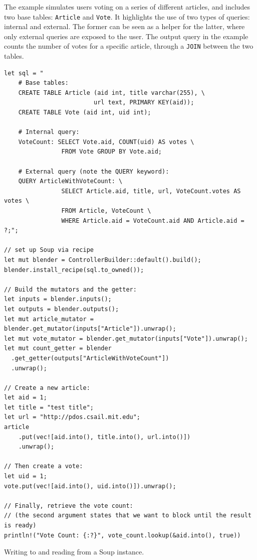 \documentclass[b5paper]{report}
\begin{document}
The example simulates users voting on a series of different articles, and
includes two base tables: \texttt{Article} and \texttt{Vote}. It highlights the
use of two types of queries: internal and external. The former can be seen as a
helper for the latter, where only external queries are exposed to the user. The
output query in the example counts the number of votes for a specific article,
through a \texttt{JOIN} between the two tables.

\begin{listing}[H]
  \begin{verbatim}
let sql = "
    # Base tables:
    CREATE TABLE Article (aid int, title varchar(255), \
                         url text, PRIMARY KEY(aid));
    CREATE TABLE Vote (aid int, uid int);

    # Internal query:
    VoteCount: SELECT Vote.aid, COUNT(uid) AS votes \
                FROM Vote GROUP BY Vote.aid;

    # External query (note the QUERY keyword):
    QUERY ArticleWithVoteCount: \
                SELECT Article.aid, title, url, VoteCount.votes AS votes \
                FROM Article, VoteCount \
                WHERE Article.aid = VoteCount.aid AND Article.aid = ?;";

// set up Soup via recipe
let mut blender = ControllerBuilder::default().build();
blender.install_recipe(sql.to_owned());

// Build the mutators and the getter:
let inputs = blender.inputs();
let outputs = blender.outputs();
let mut article_mutator = blender.get_mutator(inputs["Article"]).unwrap();
let mut vote_mutator = blender.get_mutator(inputs["Vote"]).unwrap();
let mut count_getter = blender
  .get_getter(outputs["ArticleWithVoteCount"])
  .unwrap();

// Create a new article:
let aid = 1;
let title = "test title";
let url = "http://pdos.csail.mit.edu";
article
    .put(vec![aid.into(), title.into(), url.into()])
    .unwrap();

// Then create a vote:
let uid = 1;
vote.put(vec![aid.into(), uid.into()]).unwrap();

// Finally, retrieve the vote count:
// (the second argument states that we want to block until the result is ready)
println!("Vote Count: {:?}", vote_count.lookup(&aid.into(), true))
  \end{verbatim}
  \caption{
    Writing to and reading from a Soup instance.
    \label{lst:soup-example}
  }
\end{listing}
\end{document}
